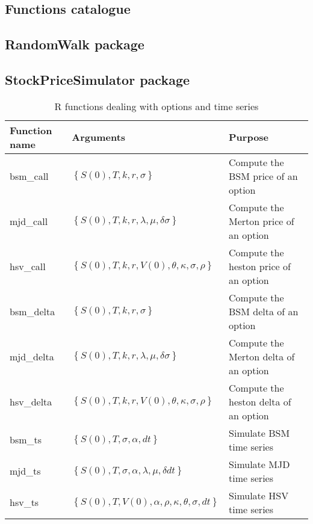 \documentclass[12pt]{report}
\begin{document}

\begin{appendices}
\chapter{Functions catalogue}
\label{cha:append:function}


\section{RandomWalk package}
\label{sec:append:randomwalk}



\section{StockPriceSimulator package}
\label{sec:append:stock}


\begin{table}[ht]
  \begin{tabularx}{\textwidth}{llX}
    \hline
    Function name & Arguments & Purpose \\
    \hline
    bsm\_call & $\left \{ S(0), T, k, r, \sigma \right \}$ & Compute the BSM price of an option \\
    mjd\_call & $\left \{ S(0), T, k, r, \lambda, \mu, \delta \sigma \right \}$ & Compute the Merton price of an option \\
    hsv\_call & $\left \{ S(0), T, k, r, V(0), \theta, \kappa, \sigma, \rho \right \}$ & Compute the heston price of an option \\
    bsm\_delta & $\left \{ S(0), T, k, r, \sigma \right \}$ & Compute the BSM delta of an option \\
    mjd\_delta & $\left \{ S(0), T, k, r, \lambda, \mu, \delta \sigma \right \}$ & Compute the Merton delta of an option \\
    hsv\_delta & $\left \{ S(0), T, k, r, V(0), \theta, \kappa, \sigma, \rho \right \}$ & Compute the heston delta of an option \\
    bsm\_ts & $\left \{ S(0), T, \sigma, \alpha, dt \right \}$ & Simulate BSM time series \\
    mjd\_ts & $\left \{ S(0), T, \sigma, \alpha, \lambda, \mu, \delta dt \right \}$ & Simulate MJD time series \\
    hsv\_ts & $\left \{ S(0), T, V(0), \alpha, \rho, \kappa, \theta, \sigma, dt \right \}$ & Simulate HSV time series \\
  \end{tabularx}
  \caption{R functions dealing with options and time series}
  \label{t:append:function:r}
\end{table}

\end{appendices}












\end{document}
